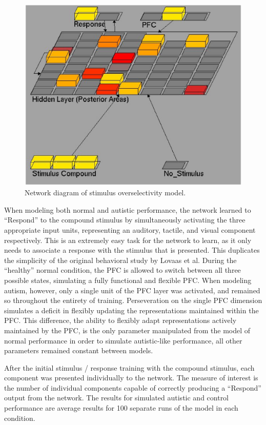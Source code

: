 \begin{figure}
\begin{center}
	\includegraphics[width=125mm]{figures/overselectivity_network.ps}
\end{center}
\caption{Network diagram of stimulus overselectivity model.} 
\label{network-diagram-2}
\end{figure}

When modeling both normal and autistic performance, the network learned to ``Respond'' to the compound stimulus by simultaneously activating the three appropriate input units, representing an auditory, tactile, and visual component respectively.  This is an extremely easy task for the network to learn, as it only needs to associate a response with the stimulus that is presented.  This duplicates the simplicity of the original behavioral study by Lovaas et al.  During the ``healthy'' normal condition, the PFC is allowed to switch between all three possible states, simulating a fully functional and flexible PFC.  When modeling autism, however, only a single unit of the PFC layer was activated, and remained so throughout the entirety of training.   Perseveration on the single PFC dimension simulates a deficit in flexibly updating the representations maintained within the PFC.  This difference, the ability to flexibly adapt representations actively maintained by the PFC, is the only parameter manipulated from the model of normal performance in order to simulate autistic-like performance, all other parameters remained constant between models.

After the initial stimulus / response training with the compound stimulus, each component was presented individually to the network.  The measure of interest is the number of individual components capable of correctly producing a ``Respond'' output from the network.  The results for simulated autistic and control performance are average results for 100 separate runs of the model in each condition.

